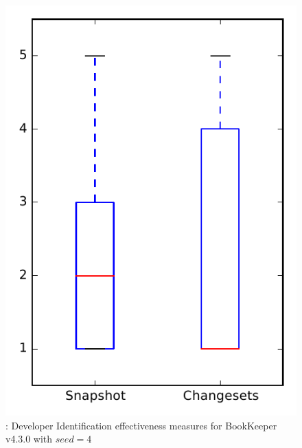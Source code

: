 
\begin{figure}
\centering
\includegraphics[height=0.4\textheight]{figures/dit_seed/rq1_bookkeeper_4}
\caption{\rtwo: Developer Identification effectiveness measures for BookKeeper v4.3.0 with $seed=4$}
\label{fig:dit_seed:rq1:bookkeeper}
\end{figure}
